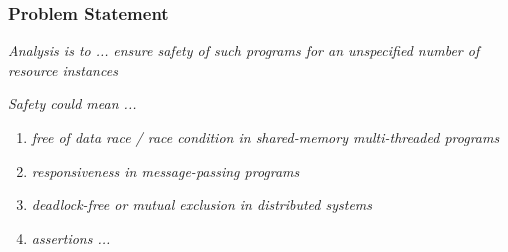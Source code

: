 \documentclass[aspectratio=169]{beamer}
\newcommand{\bhand}{\color{blue}{\ding{43}}}
\newcommand{\itbf}[1]{\textit{\textbf{#1}}}
\begin{document}
\begin{frame}
  \frametitle{Problem Statement}
  \begin{block}{\emph{Analysis is to ...}}
    \vskip4pt
    {\bhand} \emph{ensure \alert{safety} of such programs for an \alert{unspecified} number of resource instances}
  \end{block}
  \begin{block}{\emph{Safety could mean ...}}
    \vskip4pt
    \begin{enumerate}[{\bhand}]
      
    \item \emph{free of \alert{data race / race condition} in shared-memory multi-threaded programs}

    \item \emph{\alert{responsiveness} in message-passing programs}

    \item \emph{\alert{deadlock-free} or \alert{mutual exclusion} in distributed systems}

    \item \emph{\alert{assertions} ...}
    \end{enumerate}
  \end{block}
\end{frame}

\end{document}
